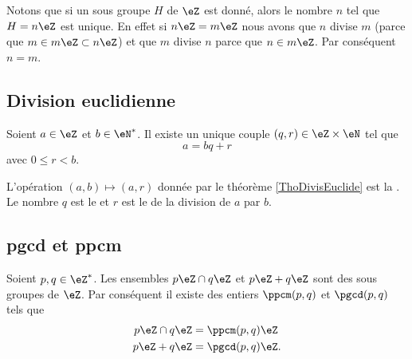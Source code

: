 Notons que si un sous groupe \( H\) de \( \eZ\) est donné, alors le nombre \( n\) tel que \( H=n\eZ\) est unique. En effet si \( n\eZ=m\eZ\) nous avons que \( n\) divise \( m\) (parce que \( m\in m\eZ\subset n\eZ\)) et que \( m\) divise \( n\) parce que \( n\in m\eZ\). Par conséquent \( n=m\).

\subsection{Division euclidienne}

\begin{theorem}     \label{ThoDivisEuclide}
    Soient \( a\in\eZ\) et \( b\in\eN^*\). Il existe un unique couple \( (q,r)\in\eZ\times\eN\) tel que
    \begin{equation}
        a=bq+r
    \end{equation}
    avec \( 0\leq r<b\).
\end{theorem}

L'opération \( (a,b)\mapsto(a,r)\) donnée par le théorème \ref{ThoDivisEuclide} est la . Le nombre \( q\) est le  et \( r\) est le  de la division de \( a\) par \( b\).

\subsection{pgcd et ppcm}

Soient \( p,q\in\eZ^*\). Les ensembles \( p\eZ\cap q\eZ\) et \( p\eZ+q\eZ\) sont des sous groupes de \( \eZ\). Par conséquent il existe des entiers \( \ppcm(p,q)\) et \( \pgcd(p,q)\) tels que
\begin{subequations}
    \begin{align}
        p\eZ\cap q\eZ&=\ppcm(p,q)\eZ\\
        p\eZ + q\eZ&=\pgcd(p,q)\eZ.
    \end{align}
\end{subequations}

